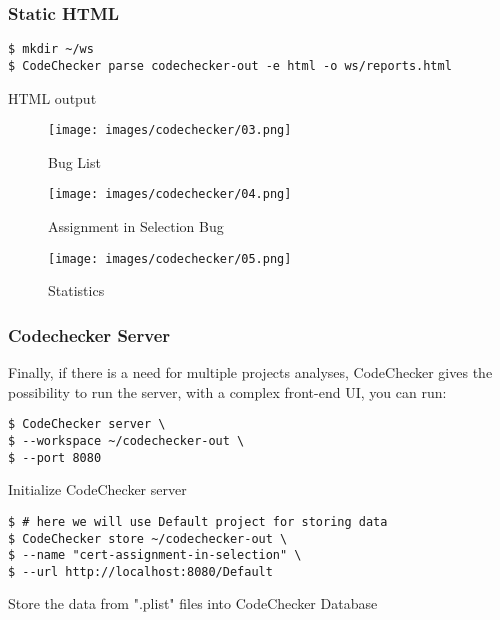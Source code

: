 \subsubsection{Static HTML} 
    
\begin{listing}[H]
\begin{verbatim}
$ mkdir ~/ws
$ CodeChecker parse codechecker-out -e html -o ws/reports.html
\end{verbatim}
\caption{HTML output}
\end{listing}

\begin{figure}[H]
\centering
    \caption{Bug List}
\texttt{[image: images/codechecker/03.png]}
\label{fig:codechecker-html-list}
\end{figure}

\begin{figure}[H]
\centering
    \caption{Assignment in Selection Bug}
\texttt{[image: images/codechecker/04.png]}
\label{fig:codechecker-html-file}
\end{figure}

\begin{figure}[H]
\centering
    \caption{Statistics}
\texttt{[image: images/codechecker/05.png]}
\label{fig:codechecker-html-stats}
\end{figure}

\subsubsection{Codechecker Server}

Finally, if there is a need for multiple projects analyses, CodeChecker gives the possibility to run the server, with a complex front-end UI, you can run:

\begin{listing}[H]
\begin{verbatim}
$ CodeChecker server \
$ --workspace ~/codechecker-out \
$ --port 8080
\end{verbatim}
\caption{Initialize CodeChecker server}
\end{listing}

\begin{listing}[H]
\begin{verbatim}
$ # here we will use Default project for storing data
$ CodeChecker store ~/codechecker-out \
$ --name "cert-assignment-in-selection" \
$ --url http://localhost:8080/Default
\end{verbatim}
\caption{Store the data from ".plist" files into CodeChecker Database}
\end{listing}

